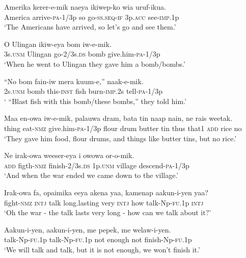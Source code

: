 \ea
\gll  Amerika  kerer-e-mik  naeya  ikiwep-ko  wia  uruf-ikua. \\
America  arrive-\textsc{pa}-1/3p  so  go-\textsc{ss.seq}-\textsc{if}  3p.\textsc{acc}  see-\textsc{imp}.1p \\
\glt ‘The Americans have arrived, so let’s go and see them.’ \\
\z


\ea
\gll  O  Ulingan  ikiw-eya  bom  iw-e-mik. \\
3s.\textsc{unm}  Ulingan  go-2/3s.\textsc{ds}  bomb  give.him-\textsc{pa}-1/3p \\
\glt ‘When he went to Ulingan they gave him a bomb/bombs.’ \\
\z


\ea
\gll  “No  bom  fain-iw  mera  kuum-e,”  naak-e-mik. \\
2s.\textsc{unm}  bomb  this-\textsc{inst}  fish  burn-\textsc{imp}.2s  tell-\textsc{pa}-1/3p \\
\glt ‘ “Blast fish with this bomb/these bombs,” they told him.’ \\
\z


\ea
\gll  Maa  en-owa  iw-e-mik,  palauwa  dram,    bata  tin  naap  nain,  ne  rais  weetak. \\
thing  eat-\textsc{nmz}  give.him-\textsc{pa}-1/3p  flour  drum   butter  tin  thus  that1  \textsc{add}  rice  no \\


\glt ‘They gave him food, flour drums, and things like butter tins, but no rice.’ \\
\z


\ea
\gll  Ne  irak-owa  weeser-eya  i  owowa  or-o-mik. \\
\textsc{add}  figth-\textsc{nmz}  finish-2/3s.\textsc{ds}  1p.\textsc{unm}  village  descend-\textsc{pa}-1/3p \\
\glt ‘And when the war ended we came down to the village.’ \\
\z


\ea
\gll  Irak-owa  fa,  opaimika  eeya  akena  yaa,  kamenap  aakun-i-yen  yaa? \\
fight-\textsc{nmz}  \textsc{intj}  talk  long.lasting  very  \textsc{intj}  how       talk-Np-\textsc{fu}.1p  \textsc{intj} \\


\glt ‘Oh the war - the talk lasts very long - how can we talk about it?’ \\
\z


\ea
\gll  Aakun-i-yen,  aakun-i-yen,  me  pepek,  me  welaw-i-yen. \\
talk-Np-\textsc{fu}.1p  talk-Np-\textsc{fu}.1p  not  enough  not  finish-Np-\textsc{fu}.1p \\
\glt ‘We will talk and talk, but it is not enough, we won’t finish it.’ \\
\z


